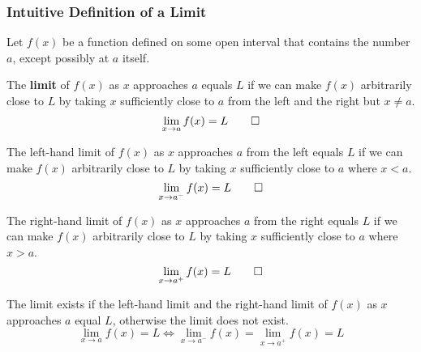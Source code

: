 \subsubsection{Intuitive Definition of a Limit}
Let \(f(x)\) be a function defined on some open interval that contains the
number \(a\), except possibly at \(a\) itself.
\begin{definition}
    The \textbf{limit} of \(f(x)\) as \(x\) approaches \(a\) equals \(L\) if
    we can make \(f(x)\) arbitrarily close to \(L\) by taking \(x\)
    sufficiently close to \(a\) from the left and the right but \(x\neq a\).
    \[\lim_{x\to a}f(x)=L\qedhere\]
\end{definition}
\begin{definition}
    The left-hand limit of \(f(x)\) as \(x\) approaches \(a\) from the left
    equals \(L\) if we can make \(f(x)\) arbitrarily close to \(L\) by taking
    \(x\) sufficiently close to \(a\) where \(x<a\).
    \[\lim_{x\to a^-}f(x)=L\qedhere\]
\end{definition}
\begin{definition}
    The right-hand limit of \(f(x)\) as \(x\) approaches \(a\) from the right
    equals \(L\) if we can make \(f(x)\) arbitrarily close to \(L\) by taking
    \(x\) sufficiently close to \(a\) where \(x>a\).
    \[\lim_{x\to a^+}f(x)=L\qedhere\]
\end{definition}
The limit exists if the left-hand limit and the right-hand limit of \(f(x)\)
as \(x\) approaches \(a\) equal \(L\), otherwise the limit does not exist.
\[\lim_{x\to a}f(x)=L\iff\lim_{x\to a^-}f(x)=\lim_{x\to a^+}f(x)=L\]